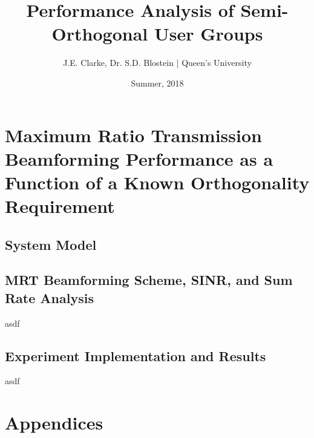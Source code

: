 \documentclass[11pt]{article}
\title{Performance Analysis of Semi-Orthogonal User Groups}
\author{J.E. Clarke, Dr. S.D. Blostein | Queen's University}
\date{Summer, 2018}
\begin{document}
	\maketitle
	\newpage
    \section{Maximum Ratio Transmission Beamforming Performance as a Function of a Known Orthogonality Requirement}
    	\subsection{System Model}
            
        \subsection{MRT Beamforming Scheme, SINR, and Sum Rate Analysis}
        asdf
        \subsection{Experiment Implementation and Results}
        asdf

    \newpage
	\section{Appendices}
    \newpage	
 	\begingroup
 		\renewcommand{\section}[2]{}%
 		
% 		
 	\endgroup
\end{document}
